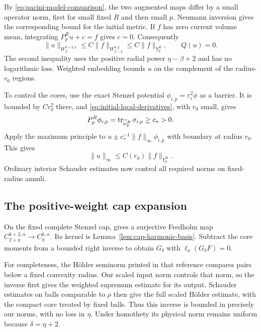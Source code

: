 By \eqref{eq:pacini-model-comparison}, the two
augmented maps differ by a small operator norm,
first for small fixed $R$ and then small $p$.
Neumann inversion gives the corresponding bound
for the initial metric. If $f$ has zero current
volume mean, integrating $P_p^Ru+c=f$ gives $c=0$.
Consequently
\begin{equation}\label{eq:negative-weight-inverse}
 \|u\|_{W^{k+2,q}_\beta}
 \le C\|f\|_{W^{k,q}_{\beta-2}}
 \le C\|f\|_{Y_p^R},\qquad Q(u)=0.
\end{equation}
The second inequality uses the positive radial
power $\eta-\beta+2$ and has no logarithmic loss.
Weighted embedding bounds $u$ on the complement
of the radius-$r_0$ regions.

To control the cores, use the exact Stenzel
potential $\phi_{i,p}=\varepsilon_i^2\phi$ as
a barrier. It is bounded by $Cr_0^2$ there, and
\eqref{eq:initial-local-derivatives}, with $r_0$
small, gives
\[
 P_p^R\phi_{i,p}
       =\operatorname{tr}_{\widetilde\omega_p^R}\sigma_{i,p}\ge c_*>0.
\]
Apply the maximum principle to
$u\pm c_*^{-1}\|f\|_\infty\phi_{i,p}$ with
boundary at radius $r_0$. This gives
\begin{equation}\label{eq:uniform-potential-supremum}
 \|u\|_\infty\le C(r_0)\|f\|_{Y_p^R}.
\end{equation}
Ordinary interior Schauder estimates now control
all required norms on fixed-radius annuli.

\subsection{The positive-weight cap expansion}

On the fixed complete Stenzel cap,
\cite[Theorems~2.9 and 2.11]{conlon-hein}
gives a surjective Fredholm map
$C^{k+2,\alpha}_{2+\eta}\to C^{k,\alpha}_\eta$.
Its kernel is Lemma~\ref{lem:cap-harmonic-basis}.
Subtract the core moments from a bounded right
inverse to obtain $G_\delta$ with
$\ell_a(G_\delta F)=0$.

For completeness, the Hölder seminorm printed
in that reference compares pairs below a fixed
convexity radius. Our scaled input norm controls
that norm, so the inverse first gives the weighted
supremum estimate for its output. Schauder
estimates on balls comparable to $\rho$ then give
the full scaled Hölder estimate, with the compact
core treated by fixed balls. Thus this inverse
is bounded in precisely our norms, with no loss
in $\eta$. Under homothety its physical norm
remains uniform because $\delta=\eta+2$.

